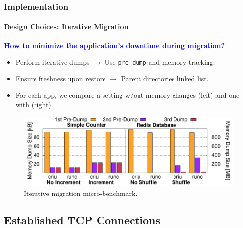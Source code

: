 \documentclass[9pt,    %
    english,            %
    xcolor=table,       %
    envcountsect,        %
    aspectratio=169     %
]{beamer}
\begin{document}
\begin{frame}
    \frametitle{Implementation}
    \framesubtitle{Design Choices: Iterative Migration}

    \vspace{10pt}

    \textbf{\textcolor{blue}{How to minimize the application's downtime during migration?}}
    \begin{itemize}
        \item Perform iterative dumps $\rightarrow$ Use \texttt{pre-dump} and memory tracking.
        \item Ensure freshness upon restore $\rightarrow$ Parent directories linked list.
        \item For each app, we compare a setting w/out memory changes (left) and one with (right).
    \end{itemize}

    \vspace{-5pt}

    \begin{figure}
        \centering
        \includegraphics[width=.75\textwidth]{./figs/iterative_migration_microbenchmark.pdf}
        \caption{Iterative migration micro-benchmark.\label{fig:iterative-microbecnhmark}}
    \end{figure}
    
\end{frame}

\subsection{Established TCP Connections}
\end{document}
